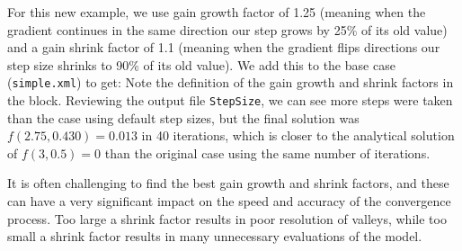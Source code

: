 For this new example, we use gain growth factor of 1.25 (meaning when the gradient continues in the same
direction our step grows by 25\% of its old value) and a gain shrink factor of 1.1 (meaning when the
gradient flips directions our step size shrinks to 90\% of its old value).  We add this to the base case
(\texttt{simple.xml}) to get:
Note the definition of the gain growth and shrink factors in the  block.  Reviewing the
output file \texttt{StepSize}, we can see more steps were taken than the case using default step sizes, but
the final solution was $f(2.75,0.430)=0.013$ in 40 iterations, which is closer to the analytical solution of $f(3,0.5)=0$
than the original case using the same number of iterations.

It is often challenging to find the best gain growth and shrink factors, and these can have a very significant
impact on the speed and accuracy of the convergence process.  Too large a shrink factor results in poor
resolution of valleys, while too small a shrink factor results in many unnecessary evaluations of the model.




